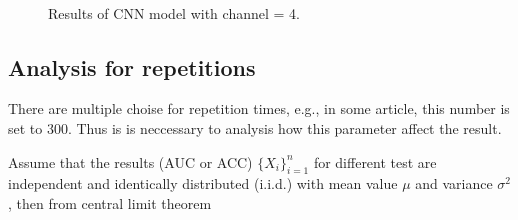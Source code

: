 \documentclass[11pt]{article}
\begin{document}
\begin{figure}[H]
    \centering
     \\
    \caption{Results of CNN model with channel = 4.}
\end{figure}

\subsection{Analysis for repetitions}
\label{analysis-for-repetitions}

There are multiple choise for repetition times, e.g., in some article, this number is set to $300$\cite{Leming2021-on}. Thus is is neccessary to analysis how this parameter affect the result.

Assume that the results (AUC or ACC) $\{X_i\}_{i=1}^n$ for different test are independent and identically distributed (i.i.d.) with mean value $\mu$ and variance $\sigma^2$, then from central limit theorem
\end{document}
